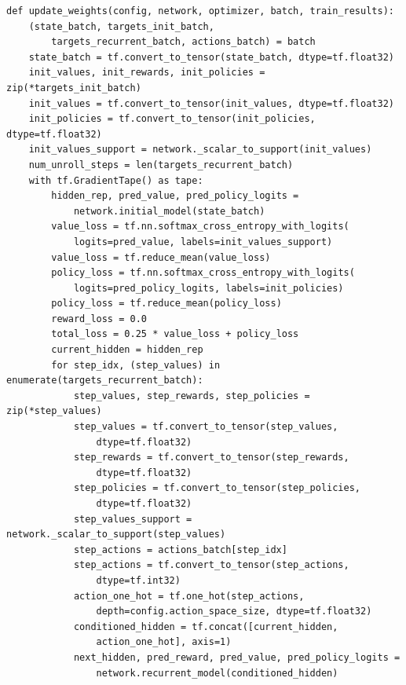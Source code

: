 \documentclass[12pt]{article}
\begin{document}
\begin{tcolorbox}[height=50em, width=\textwidth]
\begin{center}
    \begin{verbatim}
def update_weights(config, network, optimizer, batch, train_results):
    (state_batch, targets_init_batch,
        targets_recurrent_batch, actions_batch) = batch
    state_batch = tf.convert_to_tensor(state_batch, dtype=tf.float32)
    init_values, init_rewards, init_policies = zip(*targets_init_batch)
    init_values = tf.convert_to_tensor(init_values, dtype=tf.float32)
    init_policies = tf.convert_to_tensor(init_policies, dtype=tf.float32)
    init_values_support = network._scalar_to_support(init_values)
    num_unroll_steps = len(targets_recurrent_batch)
    with tf.GradientTape() as tape:
        hidden_rep, pred_value, pred_policy_logits =
            network.initial_model(state_batch)
        value_loss = tf.nn.softmax_cross_entropy_with_logits(
            logits=pred_value, labels=init_values_support)
        value_loss = tf.reduce_mean(value_loss)
        policy_loss = tf.nn.softmax_cross_entropy_with_logits(
            logits=pred_policy_logits, labels=init_policies)
        policy_loss = tf.reduce_mean(policy_loss)
        reward_loss = 0.0
        total_loss = 0.25 * value_loss + policy_loss
        current_hidden = hidden_rep
        for step_idx, (step_values) in enumerate(targets_recurrent_batch):
            step_values, step_rewards, step_policies = zip(*step_values)
            step_values = tf.convert_to_tensor(step_values,
                dtype=tf.float32)
            step_rewards = tf.convert_to_tensor(step_rewards,
                dtype=tf.float32)
            step_policies = tf.convert_to_tensor(step_policies,
                dtype=tf.float32)
            step_values_support = network._scalar_to_support(step_values)
            step_actions = actions_batch[step_idx]
            step_actions = tf.convert_to_tensor(step_actions,
                dtype=tf.int32)
            action_one_hot = tf.one_hot(step_actions,
                depth=config.action_space_size, dtype=tf.float32)
            conditioned_hidden = tf.concat([current_hidden,
                action_one_hot], axis=1)
            next_hidden, pred_reward, pred_value, pred_policy_logits =
                network.recurrent_model(conditioned_hidden)
    \end{verbatim}
\end{center}
\end{tcolorbox}
\end{document}
